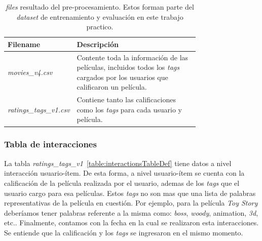 \documentclass[11pt,a4paper,twoside]{thesis}
\begin{document}
\begin{table}[!htb]
	\centering
	\footnotesize
	\begin{tabular}{l | p{0.75\linewidth}}
		\hline
		Filename                       & Descripción                                                                                                                             \\
		\hline
		\textit{movies\_v4.csv}        & Contente toda la información de las películas, incluidos todos los \textit{tags} cargados por los usuarios que calificaron un película. \\
		\textit{ratings\_tags\_v1.csv} & Contiene tanto las calificaciones como los \textit{tags} para cada usuario y película.                                                  \\
		\hline
	\end{tabular}
	\caption{
		\textit{files} resultado del pre-procesamiento. Estos forman parte del \textit{dataset} de entrenamiento y evaluación en este trabajo practico.
	}
	\label{table:tableFiles}
\end{table}

\subsubsection{Tabla de interacciones}

La tabla \textit{ratings\_tags\_v1}~\ref{table:interactionsTableDef} tiene
datos a nivel interacción usuario-ítem. De esta forma, a nivel usuario-ítem se
cuenta con la calificación de la película realizada por el usuario, ademas de
los \textit{tags} que el usuario cargo para esa películas. Estos \textit{tags}
no son mas que una lista de palabras representativas de la película en
cuestión. Por ejemplo, para la película \textit{Toy Story} deberíamos tener
palabras referente a la misma como: \textit{boss}, \textit{woody}, animation,
\textit{3d}, etc.. Finalmente, contamos con la fecha en la cual se realizaron
esta interacciones. Se entiende que la calificación y los \textit{tags} se
ingresaron en el mismo momento.
\end{document}
